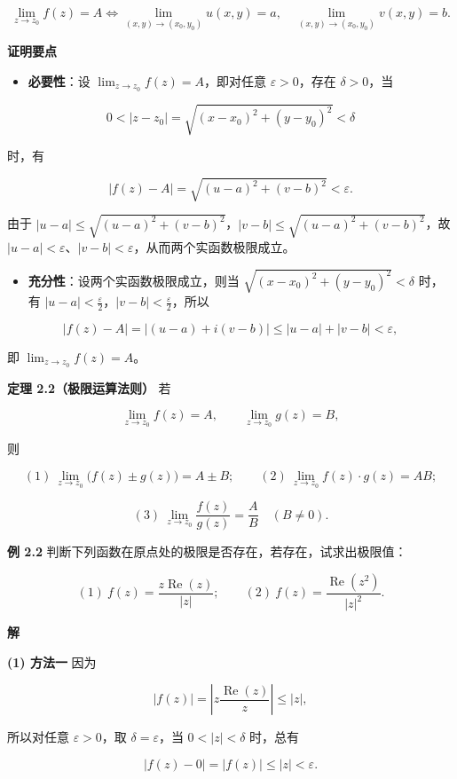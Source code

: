 \[
\lim_{z\to z_0}f(z)=A
\iff
\lim_{(x,y)\to(x_0,y_0)}u(x,y)=a,\quad
\lim_{(x,y)\to(x_0,y_0)}v(x,y)=b .
\]

\textbf{证明要点}

\begin{itemize}
\tightlist
\item
  \textbf{必要性}：设 \(\lim_{z\to z_0}f(z)=A\)，即对任意
  \(\varepsilon>0\)，存在 \(\delta>0\)，当
\end{itemize}

\[
0<|z-z_0|=\sqrt{(x-x_0)^2+(y-y_0)^2}<\delta
\]

时，有

\[
|f(z)-A|=\sqrt{(u-a)^2+(v-b)^2}<\varepsilon .
\]

由于
\(|u-a|\le\sqrt{(u-a)^2+(v-b)^2}\)，\(|v-b|\le\sqrt{(u-a)^2+(v-b)^2}\)，故
\(|u-a|<\varepsilon\)、\(|v-b|<\varepsilon\)，从而两个实函数极限成立。

\begin{itemize}
\tightlist
\item
  \textbf{充分性}：设两个实函数极限成立，则当
  \(\sqrt{(x-x_0)^2+(y-y_0)^2}<\delta\) 时，有
  \(|u-a|<\frac{\varepsilon}{2}\)，\(|v-b|<\frac{\varepsilon}{2}\)，所以
\end{itemize}

\[
|f(z)-A|=|(u-a)+i(v-b)|\le|u-a|+|v-b|<\varepsilon ,
\]

即 \(\lim_{z\to z_0}f(z)=A\)。

\textbf{定理 2.2（极限运算法则）} 若

\[
\lim_{z\to z_0}f(z)=A,\qquad \lim_{z\to z_0}g(z)=B,
\]

则

\[
(1)\ \lim_{z\to z_0}\bigl(f(z)\pm g(z)\bigr)=A\pm B;\qquad
(2)\ \lim_{z\to z_0}f(z)\cdot g(z)=AB;
\]

\[
(3)\ \lim_{z\to z_0}\frac{f(z)}{g(z)}=\frac{A}{B}\quad (B\neq 0).
\]

\textbf{例 2.2}
判断下列函数在原点处的极限是否存在，若存在，试求出极限值：

\[
(1)\ f(z)=\frac{z\operatorname{Re}(z)}{|z|};\qquad
(2)\ f(z)=\frac{\operatorname{Re}(z^2)}{|z|^2}.
\]

\textbf{解}

\textbf{(1) 方法一} 因为

\[
|f(z)|=\left|z\frac{\operatorname{Re}(z)}{z}\right|\le |z|,
\]

所以对任意 \(\varepsilon>0\)，取 \(\delta=\varepsilon\)，当
\(0<|z|<\delta\) 时，总有

\[
|f(z)-0|=|f(z)|\le|z|<\varepsilon .
\]

